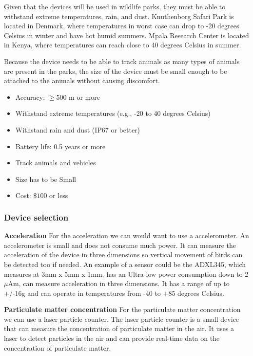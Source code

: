 Given that the devices will be used in wildlife parks, they must be able to withstand extreme temperatures, rain, and dust. Knuthenborg Safari Park is located in Denmark, where temperatures in worst case can drop to -20 degrees Celsius in winter and have hot humid summers. Mpala Research Center is located in Kenya, where temperatures can reach close to 40 degrees Celsius in summer. 

Because the device needs to be able to track animals as many types of animals are present in the parks, the size of the device must be small enough to be attached to the animals without causing discomfort. 

\begin{itemize}
  \item Accuracy: $\geq$500 m or more
  \item Withstand extreme temperatures (e.g., -20 to 40 degrees Celsius)
  \item Withstand rain and dust (IP67 or better)
  \item Battery life: 0.5 years or more
  \item Track animals and vehicles
  \item Size has to be Small
  \item Cost: $\mathdollar100$ or less
\end{itemize}


\subsubsection{Device selection}

\textbf{Acceleration}
For the acceleration we can would want to use a accelerometer. An accelerometer is small and does not consume much power. It can measure the acceleration of the device in three dimensions so vertical movement of birds can be detected too if needed. An example of a sensor could be the ADXL345, which measures at 3mm x 5mm x 1mm, has an Ultra-low power consumption down to 2 $\mu$Am, can measure acceleration in three dimensions. It has a range of up to +/-16g and can operate in temperatures from -40 to +85 degrees Celsius.

\textbf{Particulate matter concentration}
For the particulate matter concentration we can use a laser particle counter. The laser particle counter is a small device that can measure the concentration of particulate matter in the air. It uses a laser to detect particles in the air and can provide real-time data on the concentration of particulate matter.

